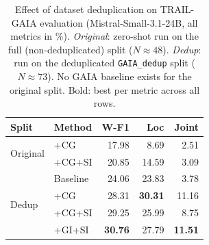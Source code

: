 \begin{table}[t]
\centering
\small
\setlength{\tabcolsep}{6pt}
\renewcommand{\arraystretch}{1.2}
\begin{tabular}{l l rrr}
\toprule
\textbf{Split} & \textbf{Method} & \textbf{W-F1} & \textbf{Loc} & \textbf{Joint} \\
\midrule
\multirow{2}{*}{Original}
  & +CG      & 17.98 &  8.69 &  2.51 \\
  & +CG+SI   & 20.85 & 14.59 &  3.09 \\
\midrule
\multirow{4}{*}{Dedup}
  & Baseline & 24.06 & 23.83 &  3.78 \\
  & +CG      & 28.31 & \textbf{30.31} & 11.16 \\
  & +CG+SI   & 29.25 & 25.99 &  8.75 \\
  & +GI+SI   & \textbf{30.76} & 27.79 & \textbf{11.51} \\
\bottomrule
\end{tabular}
\caption{%
  Effect of dataset deduplication on TRAIL-GAIA evaluation
  (Mistral-Small-3.1-24B, all metrics in \%).
  \textit{Original}: zero-shot run on the full (non-deduplicated) split ($N{\approx}48$).
  \textit{Dedup}: run on the deduplicated \texttt{GAIA\_dedup} split ($N{\approx}73$).
  No GAIA baseline exists for the original split.
  Bold: best per metric across all rows.%
}
\label{tab:ablation_dedup}
\end{table}



